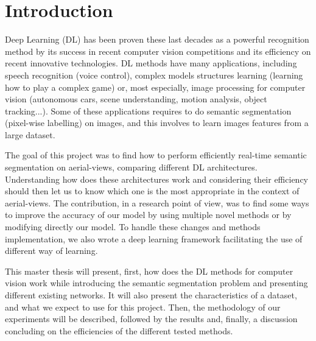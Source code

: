 \chapter*{Introduction}


Deep Learning (DL) has been proven these last decades as a powerful recognition method by its success in recent computer vision competitions and its efficiency on recent innovative technologies. DL methods have many applications, including speech recognition (voice control), complex models structures learning (learning how to play a complex game) or, most especially, image processing for computer vision (autonomous cars, scene understanding, motion analysis, object tracking...). Some of these applications requires to do semantic segmentation (pixel-wise labelling) on images, and this involves to learn images features from a large dataset.

The goal of this project was to find how to perform efficiently real-time semantic segmentation on aerial-views, comparing different DL architectures. Understanding how does these architectures work and considering their efficiency should then let us to know which one is the most appropriate in the context of aerial-views. The contribution, in a research point of view, was to find some ways to improve the accuracy of our model by using multiple novel methods or by modifying directly our model. To handle these changes and methods implementation, we also wrote a deep learning framework facilitating the use of different way of learning.

This master thesis will present, first, how does the DL methods for computer vision work while introducing the semantic segmentation problem and presenting different existing networks. It will also present the characteristics of a dataset, and what we expect to use for this project. Then, the methodology of our experiments will be described, followed by the results and, finally, a discussion concluding on the efficiencies of the different tested methods.




